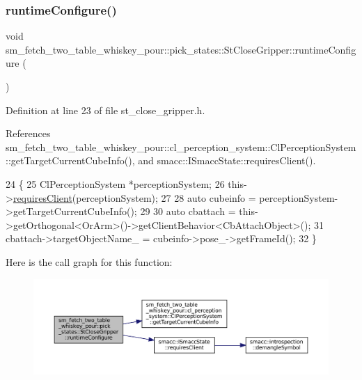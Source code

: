 \subsubsection{\texorpdfstring{runtime\+Configure()}{runtimeConfigure()}}
{\footnotesize\ttfamily void sm\+\_\+fetch\+\_\+two\+\_\+table\+\_\+whiskey\+\_\+pour\+::pick\+\_\+states\+::\+St\+Close\+Gripper\+::runtime\+Configure (\begin{DoxyParamCaption}{ }\end{DoxyParamCaption})\hspace{0.3cm}{\ttfamily [inline]}}



Definition at line 23 of file st\+\_\+close\+\_\+gripper.\+h.



References sm\+\_\+fetch\+\_\+two\+\_\+table\+\_\+whiskey\+\_\+pour\+::cl\+\_\+perception\+\_\+system\+::\+Cl\+Perception\+System\+::get\+Target\+Current\+Cube\+Info(), and smacc\+::\+I\+Smacc\+State\+::requires\+Client().


\begin{DoxyCode}
24          \{
25             ClPerceptionSystem *perceptionSystem;
26             this->\hyperlink{classsmacc_1_1ISmaccState_a7f95c9f0a6ea2d6f18d1aec0519de4ac}{requiresClient}(perceptionSystem);
27 
28             \textcolor{keyword}{auto} cubeinfo = perceptionSystem->getTargetCurrentCubeInfo();
29 
30             \textcolor{keyword}{auto} cbattach = this->getOrthogonal<OrArm>()->getClientBehavior<CbAttachObject>();
31             cbattach->targetObjectName\_ = cubeinfo->pose\_->getFrameId();
32          \}
\end{DoxyCode}
Here is the call graph for this function\+:
\nopagebreak
\begin{figure}[H]
\begin{center}
\leavevmode
\includegraphics[width=350pt]{structsm__fetch__two__table__whiskey__pour_1_1pick__states_1_1StCloseGripper_a9b7ed7f88613b43546c16cd5f525a860_cgraph}
\end{center}
\end{figure}
\mbox{\label{structsm__fetch__two__table__whiskey__pour_1_1pick__states_1_1StCloseGripper_ade517d3b1f67d2ab4cf2298c8a5174c6}} 

